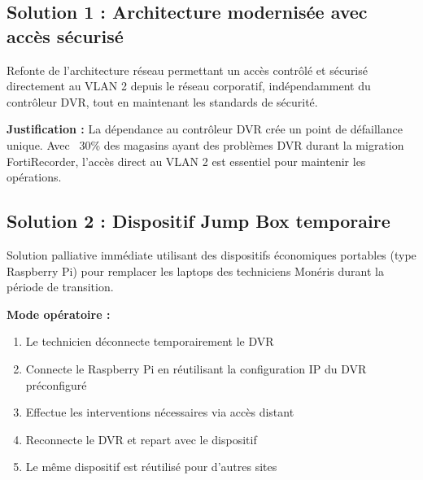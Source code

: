 \documentclass{UTT-Books-44}
\begin{document}

\subsection{Solution 1 : Architecture modernisée avec accès sécurisé}

Refonte de l'architecture réseau permettant un accès contrôlé et sécurisé directement au VLAN 2 depuis le réseau corporatif, indépendamment du contrôleur DVR, tout en maintenant les standards de sécurité.

\textbf{Justification :} La dépendance au contrôleur DVR crée un point de défaillance unique. Avec ~30\% des magasins ayant des problèmes DVR durant la migration FortiRecorder, l'accès direct au VLAN 2 est essentiel pour maintenir les opérations.


\subsection{Solution 2 : Dispositif Jump Box temporaire}

Solution palliative immédiate utilisant des dispositifs économiques portables (type Raspberry Pi) pour remplacer les laptops des techniciens Monéris durant la période de transition.

\textbf{Mode opératoire :}
\begin{enumerate}
\item Le technicien déconnecte temporairement le DVR
\item Connecte le Raspberry Pi en réutilisant la configuration IP du DVR préconfiguré
\item Effectue les interventions nécessaires via accès distant
\item Reconnecte le DVR et repart avec le dispositif
\item Le même dispositif est réutilisé pour d'autres sites
\end{enumerate}

\end{document}
